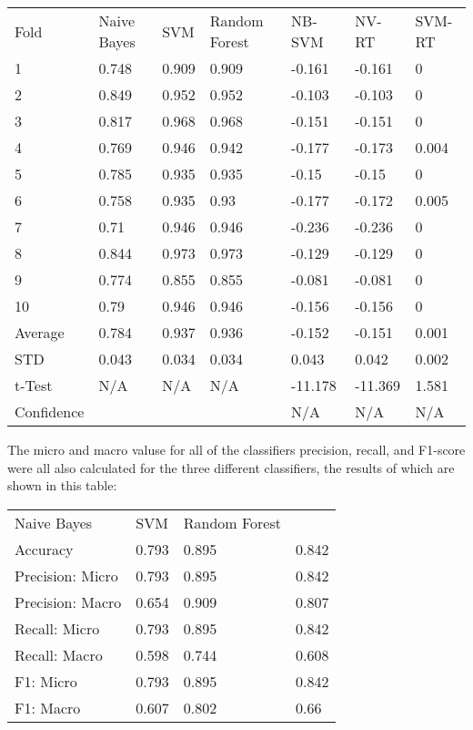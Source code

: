 \documentclass[11pt]{article}
\begin{document}
\begin{table}[h]
\centering
\begin{tabular}{| l | l | l | l | l | l | l |}
Fold       & Naive Bayes & SVM   & Random Forest & NB-SVM  & NV-RT   & SVM-RT \\
1          & 0.748       & 0.909 & 0.909         & -0.161  & -0.161  & 0      \\
2          & 0.849       & 0.952 & 0.952         & -0.103  & -0.103  & 0      \\
3          & 0.817       & 0.968 & 0.968         & -0.151  & -0.151  & 0      \\
4          & 0.769       & 0.946 & 0.942         & -0.177  & -0.173  & 0.004  \\
5          & 0.785       & 0.935 & 0.935         & -0.15   & -0.15   & 0      \\
6          & 0.758       & 0.935 & 0.93          & -0.177  & -0.172  & 0.005  \\
7          & 0.71        & 0.946 & 0.946         & -0.236  & -0.236  & 0      \\
8          & 0.844       & 0.973 & 0.973         & -0.129  & -0.129  & 0      \\
9          & 0.774       & 0.855 & 0.855         & -0.081  & -0.081  & 0      \\
10         & 0.79        & 0.946 & 0.946         & -0.156  & -0.156  & 0      \\
Average    & 0.784       & 0.937 & 0.936         & -0.152  & -0.151  & 0.001  \\
STD        & 0.043       & 0.034 & 0.034         & 0.043   & 0.042   & 0.002  \\
t-Test     & N/A         & N/A   & N/A           & -11.178 & -11.369 & 1.581  \\
Confidence &             &       &               & N/A     & N/A     & N/A  
\end{tabular}
\end{table}

The micro and macro valuse for all of the classifiers precision, recall, and F1-score were all also calculated for the three different classifiers, the results of which are shown in this table:

\begin{table}[h]
\centering
\begin{tabular}{| l | l | l | l |}
Naive Bayes      & SVM   & Random Forest &       \\
Accuracy         & 0.793 & 0.895         & 0.842 \\
Precision: Micro & 0.793 & 0.895         & 0.842 \\
Precision: Macro & 0.654 & 0.909         & 0.807 \\
Recall: Micro    & 0.793 & 0.895         & 0.842 \\
Recall: Macro    & 0.598 & 0.744         & 0.608 \\
F1: Micro        & 0.793 & 0.895         & 0.842 \\
F1: Macro        & 0.607 & 0.802         & 0.66
\end{tabular}
\end{table}
\end{document}
